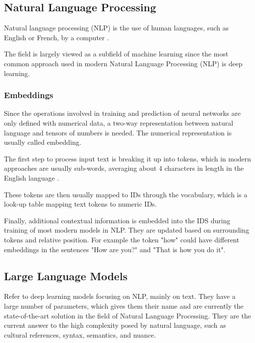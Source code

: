\subsection{Natural Language Processing}

\begin{definition}
    Natural language processing (NLP) is the use of human languages, such as
English or French, by a computer \cite[p.461]{goodfellow2016deep}. 
\end{definition}

The field is largely viewed as a subfield of machine learning since the most common approach used in modern Natural Language Processing (NLP) is deep learning.

\subsubsection{Embeddings}
Since the operations involved in training and prediction of neural networks are only defined with numerical data, a two-way representation between natural language and tensors of numbers is needed. The numerical representation is usually called embedding.

The first step to process input text is breaking it up into tokens, which in modern approaches are usually sub-words, averaging about 4 characters in length in the English language \cite{OpenAITokens}.

These tokens are then usually mapped to IDs through the vocabulary, which is a look-up table mapping text tokens to numeric IDs.

Finally, additional contextual information is embedded into the IDS during training of most modern models in NLP. They are updated based on surrounding tokens and relative position. For example the token "how" could have different embeddings in the sentences "How are you?" and "That is how you do it".

\subsection{Large Language Models}

Refer to deep learning models focusing on NLP, mainly on text. They have a large number of parameters, which gives them their name and are currently the state-of-the-art solution in the field of Natural Language Processing. They are the current answer to the high complexity posed by natural language, such as cultural references, syntax, semantics, and nuance.

